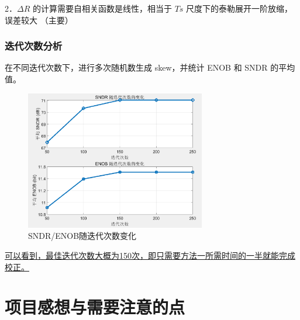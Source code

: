 \documentclass[cs4size,a4paper]{ctexart}
\numberwithin{equation}{section}
\numberwithin{table}{section}
\numberwithin{figure}{section}
\begin{document}
		2．$\Delta R$ 的计算需要自相关函数是线性，相当于 $T s$ 尺度下的泰勒展开一阶放缩，误差较大 （主要）
			
		
		\subsubsection{迭代次数分析}
		在不同迭代次数下，进行多次随机数生成 skew，并统计 ENOB 和 SNDR 的平均值。
		
		\begin{figure}[H]
			\centering
			\includegraphics[width=0.7\textwidth]{figure/cor6.png}
			\caption{SNDR/ENOB随迭代次数变化} 
			\label{fig:cor6}
		\end{figure}
		
		\underline{可以看到，最佳迭代次数大概为150次，即只需要方法一所需时间的一半就能完成校正。}
\newpage
		\section{项目感想与需要注意的点}
\end{document}
